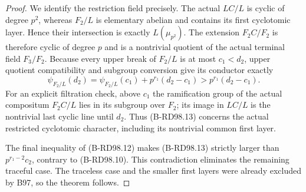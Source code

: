 \begin{proof}
We identify the restriction field precisely. The actual
$LC/L$ is cyclic of degree $p^2$, whereas $F_2/L$ is
elementary abelian and contains its first cyclotomic layer.
Hence their intersection is exactly $L(\mu_{p^2})$.
The extension $F_2C/F_2$ is therefore cyclic of degree $p$
and is a nontrivial quotient of the actual terminal field
$F_3/F_2$. Because every upper break of $F_2/L$ is at most
$c_1<d_2$, upper quotient compatibility and subgroup
conversion give its conductor exactly
\[
 \psi_{F_2/L}(d_2)
  =\psi_{F_2/L}(c_1)+p^{r_1}(d_2-c_1)
  >p^{r_1}(d_2-c_1).
                                                        \tag{B-RD98.13}
\]
For an explicit filtration check, above $c_1$ the ramification
group of the actual compositum $F_2C/L$ lies in its subgroup
over $F_2$; its image in $LC/L$ is the nontrivial last cyclic
line until $d_2$. Thus (B-RD98.13) concerns the actual restricted
cyclotomic character, including its nontrivial common first layer.

The final inequality of (B-RD98.12) makes (B-RD98.13) strictly
larger than $p^{r_1-2}c_2$, contrary to (B-RD98.10).
This contradiction eliminates the remaining traceful case.
The traceless case and the smaller first layers were already
excluded by B97, so the theorem follows.
\end{proof}

